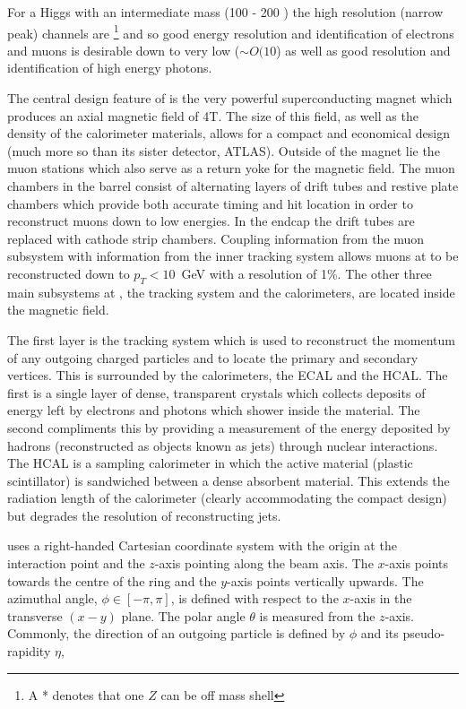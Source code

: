 For a Higgs with an intermediate mass (100 - 200 \GeV) the high resolution (narrow peak) channels are \HZZ \footnote{A * denotes that one $Z$ can be off mass shell} and \Hgg so good energy resolution and identification of electrons and muons is desirable down to very low \pT ($\sim O(10$\GeV) as well as good resolution and identification of high energy photons. 

The central design feature of \CMS is the very powerful superconducting magnet which produces an axial magnetic field of 4T. The size of this field, as well as the density of the calorimeter materials, allows for a compact and economical design (much more so than its sister detector, ATLAS). Outside of the magnet lie the muon stations which also serve as a return yoke for the magnetic field. The muon chambers in the barrel consist of alternating layers of drift tubes and restive plate chambers which provide both accurate timing and hit location in order to reconstruct muons down to low energies. In the endcap the drift tubes are replaced with cathode strip chambers. Coupling information from the muon subsystem with information from the inner tracking system allows muons at \CMS to be reconstructed down to $p_{T}<10$~GeV with a resolution of 1\%. The other three main subsystems at \CMS, the tracking system and the calorimeters, are located inside the magnetic field.

The first layer is the tracking system which is used to reconstruct the momentum of any outgoing charged particles and to locate the primary and secondary vertices. This is surrounded by the calorimeters, the \acf{ECAL} and the \acf{HCAL}. The first is a single layer of dense, transparent crystals which collects deposits of energy left by electrons and photons which shower inside the material. The second compliments this by providing a measurement of the energy deposited by hadrons (reconstructed as objects known as jets) through nuclear interactions. The \acf{HCAL} is a sampling calorimeter in which the active material (plastic scintillator) is sandwiched between a dense absorbent material. This extends the radiation length of the calorimeter (clearly accommodating the compact design) but degrades the resolution of reconstructing jets. 

\CMS uses a right-handed Cartesian coordinate system with the origin at the interaction point and the $z$-axis pointing along the beam axis. The $x$-axis points towards the centre of the \LHC ring and the $y$-axis points vertically upwards. The azimuthal angle, $\phi \in [-\pi,\pi]$, is defined with respect to the $x$-axis in the transverse $(x-y)$ plane. The polar angle $\theta$ is measured from the $z$-axis. Commonly, the direction of an outgoing particle is defined by $\phi$ and its pseudo-rapidity $\eta$,

